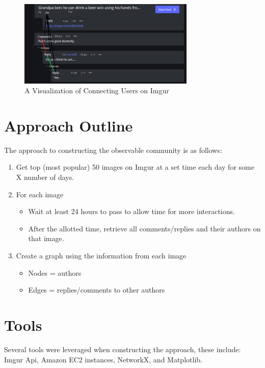 \documentclass{article}
\begin{document}
\begin{figure}[h]
    \centering
    \includegraphics[width=0.75\textwidth]{imgurExample}
    \caption{A Visualization of Connecting Users on Imgur}
    \label{imgurExample}
\end{figure}

\section{Approach Outline}\label{approach}
\par The approach to constructing the observable community is as follows:
\begin{enumerate}
    \item Get top (most popular) 50 images on Imgur at a set time each day for some X number of days.
    \item For each image
    \begin{itemize}
        \item Wait at least 24 hours to pass to allow time for more interactions.
        \item After the allotted time, retrieve all comments/replies and their authors on that image.
    \end{itemize}
    \item Create a graph using the information from each image
    \begin{itemize}
        \item Nodes = authors
        \item Edges = replies/comments to other authors
    \end{itemize}
\end{enumerate}



\section{Tools}

\par Several tools were leveraged when constructing the approach, these include: Imgur Api, Amazon EC2 instances, NetworkX, and Matplotlib. 
\end{document}
